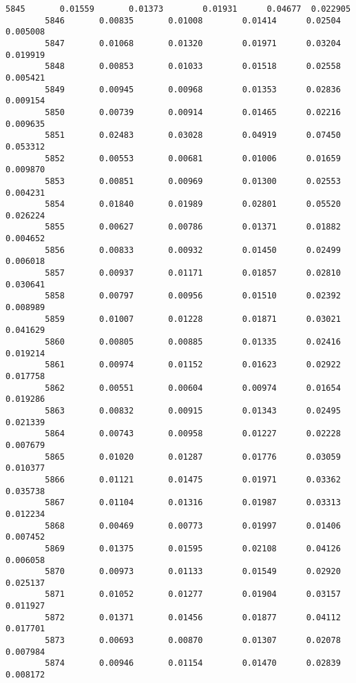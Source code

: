 \documentclass[11pt]{article}
\begin{document}
\begin{Verbatim}[commandchars=\\\{\}]
        5845       0.01559       0.01373        0.01931      0.04677  0.022905   
        5846       0.00835       0.01008        0.01414      0.02504  0.005008   
        5847       0.01068       0.01320        0.01971      0.03204  0.019919   
        5848       0.00853       0.01033        0.01518      0.02558  0.005421   
        5849       0.00945       0.00968        0.01353      0.02836  0.009154   
        5850       0.00739       0.00914        0.01465      0.02216  0.009635   
        5851       0.02483       0.03028        0.04919      0.07450  0.053312   
        5852       0.00553       0.00681        0.01006      0.01659  0.009870   
        5853       0.00851       0.00969        0.01300      0.02553  0.004231   
        5854       0.01840       0.01989        0.02801      0.05520  0.026224   
        5855       0.00627       0.00786        0.01371      0.01882  0.004652   
        5856       0.00833       0.00932        0.01450      0.02499  0.006018   
        5857       0.00937       0.01171        0.01857      0.02810  0.030641   
        5858       0.00797       0.00956        0.01510      0.02392  0.008989   
        5859       0.01007       0.01228        0.01871      0.03021  0.041629   
        5860       0.00805       0.00885        0.01335      0.02416  0.019214   
        5861       0.00974       0.01152        0.01623      0.02922  0.017758   
        5862       0.00551       0.00604        0.00974      0.01654  0.019286   
        5863       0.00832       0.00915        0.01343      0.02495  0.021339   
        5864       0.00743       0.00958        0.01227      0.02228  0.007679   
        5865       0.01020       0.01287        0.01776      0.03059  0.010377   
        5866       0.01121       0.01475        0.01971      0.03362  0.035738   
        5867       0.01104       0.01316        0.01987      0.03313  0.012234   
        5868       0.00469       0.00773        0.01997      0.01406  0.007452   
        5869       0.01375       0.01595        0.02108      0.04126  0.006058   
        5870       0.00973       0.01133        0.01549      0.02920  0.025137   
        5871       0.01052       0.01277        0.01904      0.03157  0.011927   
        5872       0.01371       0.01456        0.01877      0.04112  0.017701   
        5873       0.00693       0.00870        0.01307      0.02078  0.007984   
        5874       0.00946       0.01154        0.01470      0.02839  0.008172   
        

\end{Verbatim}
\end{document}
